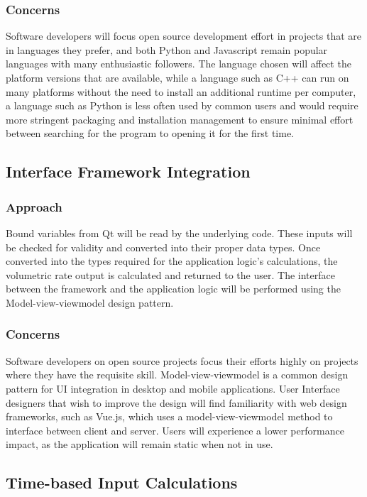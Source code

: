 \documentclass[onecolumn, draftclsnofoot,10pt, compsoc]{IEEEtran}
\begin{document}
\subsubsection{Concerns}
Software developers will focus open source development effort in projects that are in languages they prefer, and both Python and Javascript remain popular languages with many enthusiastic followers.
The language chosen will affect the platform versions that are available, while a language such as C++ can run on many platforms without the need to install an additional runtime per computer, a language such as Python is less often used by common users and would require more stringent packaging and installation management to ensure minimal effort between searching for the program to opening it for the first time.

\subsection{Interface Framework Integration}
\subsubsection{Approach}
Bound variables from Qt will be read by the underlying code.
These inputs will be checked for validity and converted into their proper data types.
Once converted into the types required for the application logic's calculations, the volumetric rate output is calculated and returned to the user.
The interface between the framework and the application logic will be performed using the Model-view-viewmodel design pattern.
\subsubsection{Concerns}
Software developers on open source projects focus their efforts highly on projects where they have the requisite skill.
Model-view-viewmodel is a common design pattern for UI integration in desktop and mobile applications. 
User Interface designers that wish to improve the design will find familiarity with web design frameworks, such as Vue.js, which uses a model-view-viewmodel method to interface between client and server.
Users will experience a lower performance impact, as the application will remain static when not in use.

\subsection{Time-based Input Calculations}
\end{document}

